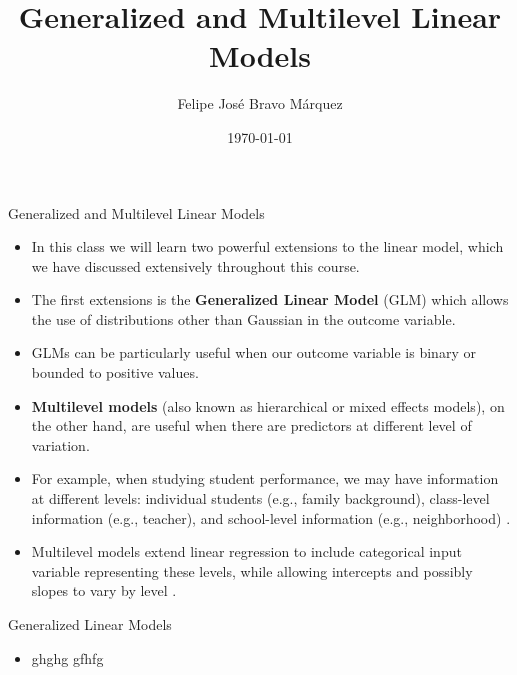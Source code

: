 \documentclass[handout]{beamer}
\title{Generalized and Multilevel Linear Models}
\author[Felipe Bravo Márquez]{\footnotesize
 \textcolor[rgb]{0.00,0.00,1.00}{Felipe José Bravo Márquez}}
\date{ \today }
\begin{document}
\begin{frame}
\titlepage


\end{frame}




\begin{frame}{Generalized and Multilevel Linear Models}
\scriptsize{
\begin{itemize}
\item In this class we will learn two powerful extensions to the linear model, which we have discussed extensively throughout this course.

\item The first extensions is the \textbf{Generalized Linear Model} (GLM) which allows the use of distributions other than Gaussian in the outcome variable.

\item GLMs can be particularly useful when our outcome variable  is binary or bounded to positive values.

\item \textbf{Multilevel models} (also known as hierarchical or mixed effects models), on the other hand, are useful when there are predictors at different level of variation.

\item For example, when studying student performance, we may have information at different levels:  individual students  (e.g., family background), class-level information (e.g., teacher), and school-level information (e.g., neighborhood) \cite{gelman2013bayesian}.


\item Multilevel models extend linear regression to include categorical input variable representing these levels, while allowing intercepts and possibly slopes to vary by level \cite{gelman2006data}.



\end{itemize}



}

\end{frame}


\begin{frame}{Generalized Linear Models}
\scriptsize{
\begin{itemize}
\item ghghg  gfhfg\cite{mcelreath2020statistical}
 
\end{itemize}



} 

\end{frame}
\end{document}
